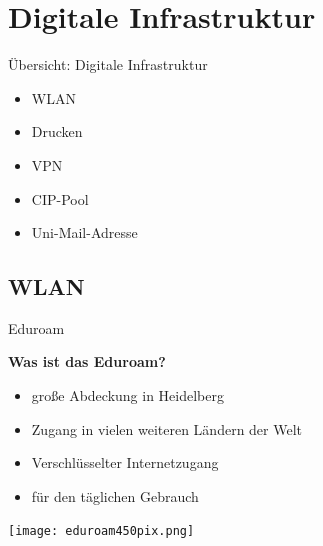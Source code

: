 
\section{Digitale Infrastruktur}
\begin{frame}{Übersicht: Digitale Infrastruktur}
    \large
    \begin{itemize}
        \item{WLAN}
        \item{Drucken}
        \item{VPN}
        \item{CIP-Pool}
        \item{Uni-Mail-Adresse}
    \end{itemize}
\end{frame}


\subsection{WLAN}
\begin{frame}{Eduroam}
    \begin{minipage}[t]{0.515\textwidth}
        \vspace{-3em}
        \large \textbf{Was ist das Eduroam?}
        \normalsize
        \begin{itemize}
            \item<1-> große Abdeckung in Heidelberg
            \item<2-> Zugang in vielen weiteren Ländern der Welt
            \item<3-> Verschlüsselter Internetzugang
            \item<4-> für den täglichen Gebrauch
        \end{itemize}
    \end{minipage}
    \begin{minipage}[t]{0.45\textwidth}
        \begin{flushright}
            \texttt{[image: eduroam450pix.png]}
        \end{flushright}
    \end{minipage}
\end{frame}

